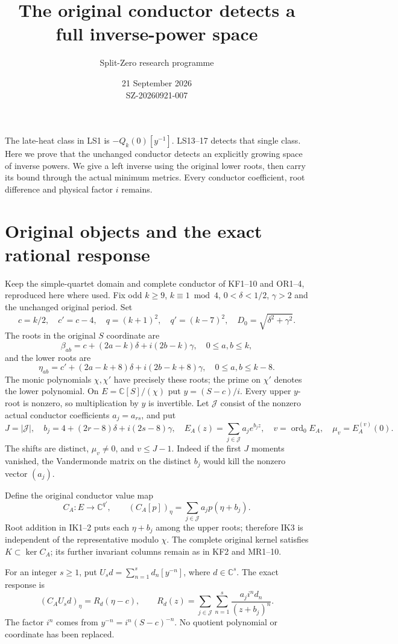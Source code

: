 \documentclass[11pt]{article}
\title{The original conductor detects a full inverse-power space}
\author{Split-Zero research programme}
\date{21 September 2026\\SZ-20260921-007}
\newcommand{\C}{\mathbb C}
\begin{document}
\maketitle

The late-heat class in LS1 is $-Q_k(0)[y^{-1}]$.
LS13--17 detects that single class. Here we prove that the unchanged
conductor detects an explicitly growing space of inverse powers.
We give a left inverse using the original lower roots, then carry its
bound through the actual minimum metrics. Every conductor coefficient,
root difference and physical factor $i$ remains.

\section{Original objects and the exact rational response}
Keep the simple-quartet domain and complete conductor of KF1--10
and OR1--4, reproduced here where used. Fix odd $k\ge9$, $k\equiv1\bmod4$,
$0<\delta<1/2$, $\gamma>2$ and the unchanged original period.
Set
\[
c=k/2,\quad c'=c-4,\quad q=(k+1)^2,\quad q'=(k-7)^2,\quad
D_0=\sqrt{\delta^2+\gamma^2}.
\]
The roots in the original $S$ coordinate are
\[
\beta_{ab}=c+(2a-k)\delta+i(2b-k)\gamma,\quad 0\le a,b\le k,
\]
and the lower roots are
\[
\eta_{ab}=c'+(2a-k+8)\delta+i(2b-k+8)\gamma,
\quad 0\le a,b\le k-8.
\tag{IK1}
\]
The monic polynomials $\chi,\chi'$ have precisely these roots;
the prime on $\chi'$ denotes the lower polynomial.
On $E=\C[S]/(\chi)$ put $y=(S-c)/i$.
Every upper $y$-root is nonzero, so multiplication by $y$ is invertible.
Let $\mathcal J$ consist of the nonzero actual conductor coefficients
$a_j=a_{rs}$, and put
\[
J=|\mathcal J|,\quad b_j=4+(2r-8)\delta+i(2s-8)\gamma,\quad
E_A(z)=\sum_{j\in\mathcal J}a_je^{b_jz},\quad
v=\operatorname{ord}_0E_A,\quad \mu_v=E_A^{(v)}(0).
\tag{IK2}
\]
The shifts are distinct, $\mu_v\ne0$, and $v\le J-1$.
Indeed if the first $J$ moments vanished, the Vandermonde matrix
on the distinct $b_j$ would kill the nonzero vector $(a_j)$.

Define the original conductor value map
\[
C_A:E\longrightarrow\C^{q'},\qquad
(C_A[p])_\eta=\sum_{j\in\mathcal J}a_jp(\eta+b_j).
\tag{IK3}
\]
Root addition in IK1--2 puts each $\eta+b_j$ among the upper roots;
therefore IK3 is independent of the representative modulo $\chi$.
The complete original kernel satisfies $K\subset\ker C_A$;
its further invariant columns remain as in KF2 and MR1--10.

For an integer $s\ge1$, put $U_s d=\sum_{n=1}^s d_n[y^{-n}]$,
where $d\in\C^s$. The exact response is
\[
(C_AU_s d)_\eta
=R_d(\eta-c),\qquad
R_d(z)=\sum_{j\in\mathcal J}\sum_{n=1}^s
 \frac{a_j i^n d_n}{(z+b_j)^n}.
\tag{IK4}
\]
The factor $i^n$ comes from $y^{-n}=i^n(S-c)^{-n}$.
No quotient polynomial or coordinate has been replaced.
\end{document}
